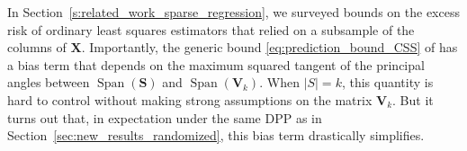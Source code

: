 \documentclass[twoside,11pt]{book}
\newtheorem{proposition}{Proposition}
\numberwithin{theorem}{chapter}
\numberwithin{definition}{chapter}
\numberwithin{proposition}{chapter}
\numberwithin{corollary}{chapter}
\numberwithin{example}{chapter}
\numberwithin{lemma}{chapter}
\numberwithin{assumption}{chapter}
\numberwithin{equation}{chapter}
\numberwithin{figure}{chapter}
\DeclareMathOperator{\Span}{\mathrm{Span}}
\DeclareMathOperator{\DPP}{\mathrm{DPP}}
\DeclareMathOperator{\eff}{\mathrm{eff}}
\DeclareMathOperator{\EX}{\mathbb{E}}
\begin{document}
 In Section~\ref{s:related_work_sparse_regression}, we surveyed bounds on the excess risk of ordinary least squares estimators that relied on a subsample of the columns of $\bm{X}$.
Importantly, the generic bound \eqref{eq:prediction_bound_CSS} of \cite{LiHa18} has a bias term that depends on the maximum squared tangent of the principal angles between $\Span(\bm{S})$ and $\Span(\bm{V}_k)$. When $|S| = k$, this quantity is hard to control without making strong assumptions on the matrix $\bm{V}_{k}$.
But it turns out that, in expectation under the same DPP as in Section~\ref{sec:new_results_randomized}, this bias term drastically simplifies.
\end{document}
